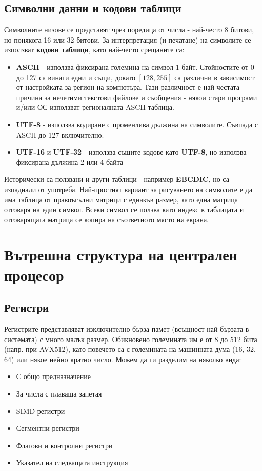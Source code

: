 \documentclass[fleqn,12pt]{article}
\begin{document}
\subsection{Символни данни и кодови таблици}
Символните низове се представят чрез поредица от числа - най-често 8 битови, но понякога 16 или 32-битови. 
За интерпретация (и печатане) на символите се използват \textbf{кодови таблици}, като най-често срещаните са:
\begin{itemize}
    \item \textbf{ASCII} - използва фиксирана големина на символ 1 байт. Стойностите от 0 до 127 са винаги едни и същи, докато
    $[128,255]$ са различни в зависимост от настройката за регион на компютъра. Тази различност е най-честата причина за нечетими
    текстови файлове и съобщения - някои стари програми и/или ОС използват регионалната ASCII таблица.
    \item \textbf{UTF-8} - използва кодиране с променлива дължина на символите. Съвпада с ASCII до 127 включително.
    \item \textbf{UTF-16} и \textbf{UTF-32} - използва същите кодове като \textbf{UTF-8}, но използва фиксирана дължина 2 или 4 байта
\end{itemize}

Исторически са ползвани и други таблици - например \textbf{EBCDIC}, но са изпаднали от употреба. Най-простият вариант за рисуването на 
символите е да има таблица от правоъгълни матрици с еднакъв размер, като една матрица отговаря на един символ. Всеки символ се ползва
като индекс в таблицата и отговарящата матрица се копира на съответното място на екрана.

\section{Вътрешна структура на централен процесор}
\subsection{Регистри}
Регистрите представляват изключително бърза памет (всъщност най-бързата в системата) с много малък размер. Обикновено големината им е от 8 до 512 бита (напр. при AVX512),
като повечето са с големината на машинната дума (16, 32, 64) или някое нейно кратно число. Можем да ги разделим на няколко вида:
\begin{itemize}
    \item С общо предназначение
    \item За числа с плаваща запетая
    \item SIMD регистри
    \item Сегментни регистри
    \item Флагови и контролни регистри
    \item Указател на следващата инструкция
\end{itemize}
\end{document}
